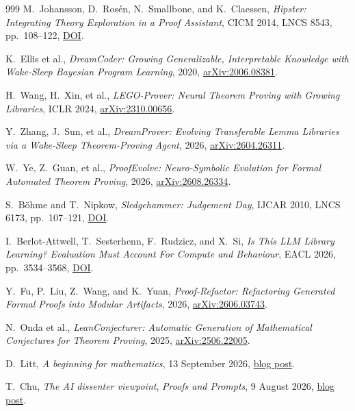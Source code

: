 \documentclass[10pt]{article}
\begin{document}
\begin{thebibliography}{999}
 M.~Johansson, D.~Ros\'en, N.~Smallbone, and K.~Claessen,
\emph{Hipster: Integrating Theory Exploration in a Proof Assistant}, CICM
2014, LNCS 8543, pp.~108--122,
\href{https://doi.org/10.1007/978-3-319-08434-3_9}{DOI}.

 K.~Ellis et al., \emph{DreamCoder: Growing
Generalizable, Interpretable Knowledge with Wake-Sleep Bayesian Program
Learning}, 2020, \href{https://arxiv.org/abs/2006.08381}{arXiv:2006.08381}.

 H.~Wang, H.~Xin, et al., \emph{LEGO-Prover: Neural
Theorem Proving with Growing Libraries}, ICLR 2024,
\href{https://arxiv.org/abs/2310.00656}{arXiv:2310.00656}.

 Y.~Zhang, J.~Sun, et al., \emph{DreamProver: Evolving
Transferable Lemma Libraries via a Wake-Sleep Theorem-Proving Agent}, 2026,
\href{https://arxiv.org/abs/2604.26311}{arXiv:2604.26311}.

 W.~Ye, Z.~Guan, et al., \emph{ProofEvolve: Neuro-Symbolic
Evolution for Formal Automated Theorem Proving}, 2026,
\href{https://arxiv.org/abs/2608.26334}{arXiv:2608.26334}.

 S.~B\"ohme and T.~Nipkow, \emph{Sledgehammer: Judgement
Day}, IJCAR 2010, LNCS 6173, pp.~107--121,
\href{https://doi.org/10.1007/978-3-642-14203-1_9}{DOI}.

 I.~Berlot-Attwell, T.~Sesterhenn, F.~Rudzicz, and
X.~Si, \emph{Is This LLM Library Learning? Evaluation Must Account For Compute
and Behaviour}, EACL 2026, pp.~3534--3568,
\href{https://doi.org/10.18653/v1/2026.eacl-long.163}{DOI}.

 Y.~Fu, P.~Liu, Z.~Wang, and K.~Yuan,
\emph{Proof-Refactor: Refactoring Generated Formal Proofs into Modular
Artifacts}, 2026, \href{https://arxiv.org/abs/2606.03743}{arXiv:2606.03743}.

 N.~Onda et al., \emph{LeanConjecturer: Automatic
Generation of Mathematical Conjectures for Theorem Proving}, 2025,
\href{https://arxiv.org/abs/2506.22005}{arXiv:2506.22005}.

 D.~Litt, \emph{A beginning for mathematics}, 13 September
2026, \href{https://www.daniellitt.com/blog/2026/9/13/a-beginning-for-mathematics/}{blog post}.

 T.~Chu, \emph{The AI dissenter viewpoint}, \emph{Proofs and
Prompts}, 9 August 2026,
\href{https://proofsandprompts.com/2026/08/09/the-ai-dissenter-viewpoint/}{blog post}.


\end{thebibliography}
\end{document}
